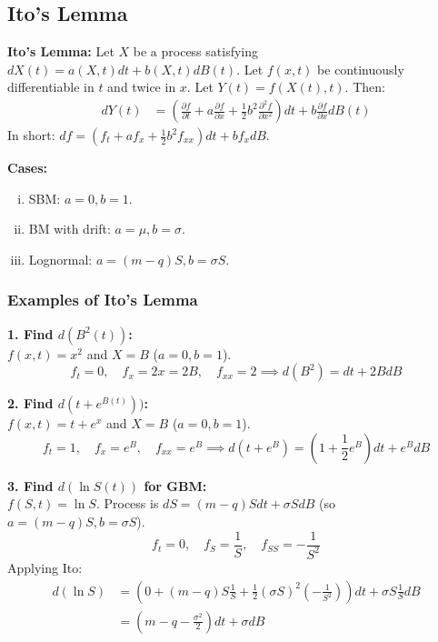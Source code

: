 \subsection{Ito's Lemma}
\begin{framed}
\textbf{Ito's Lemma: } Let \(X\) be a process satisfying \(dX(t) = a(X,t) dt + b(X,t) dB(t)\).
Let \(f(x,t)\) be continuously differentiable in \(t\) and twice in \(x\). Let \(Y(t)=f(X(t),t)\). Then:
\begin{align*}
    dY(t) &= \left( \frac{\partial f}{\partial t} + a \frac{\partial f}{\partial x} + \frac{1}{2}b^2 \frac{\partial^2f}{\partial x^2}\right)dt + b \frac{\partial f}{\partial x} dB(t)
\end{align*}
In short: \(df = (f_t + af_x + \frac{1}{2}b^2f_{xx})dt + bf_xdB\).
\end{framed}
\textbf{Cases: }
\begin{enumerate}[i.]
    \item SBM: $a=0, b=1$.
    \item BM with drift: $a=\mu, b=\sigma$.
    \item Lognormal: $a=(m-q)S, b=\sigma S$.
\end{enumerate}

\subsubsection{Examples of Ito's Lemma}

\textbf{1. Find $d(B^2(t))$:} \\
$f(x,t) = x^2$ and $X=B$ ($a=0, b=1$).
\begin{equation*}
    f_t = 0, \quad f_x = 2x = 2B, \quad f_{xx} = 2 \implies \boxed{d(B^2) = dt + 2B dB}
\end{equation*}

\textbf{2. Find $d(t + e^{B(t)}))$:} \\
$f(x,t) = t + e^x$ and $X=B$ ($a=0, b=1$).
\begin{equation*}
    f_t = 1, \quad f_x = e^B, \quad f_{xx} = e^B \implies \boxed{d(t+e^B) = (1 + \frac{1}{2}e^B)dt + e^B dB}
\end{equation*}

\textbf{3. Find $d(\ln S(t))$ for GBM:} \\
$f(S,t) = \ln S$. Process is $dS = (m-q)S dt + \sigma S dB$ (so $a=(m-q)S, b=\sigma S$).
\begin{equation*}
    f_t = 0, \quad f_S = \frac{1}{S}, \quad f_{SS} = -\frac{1}{S^2}
\end{equation*}
Applying Ito:
\begin{align*}
    d(\ln S) &= \left( 0 + (m-q)S \frac{1}{S} + \frac{1}{2}(\sigma S)^2 \left(-\frac{1}{S^2}\right) \right) dt + \sigma S \frac{1}{S} dB \\
    &= \boxed{\left( m - q - \frac{\sigma^2}{2} \right) dt + \sigma dB}
\end{align*}

